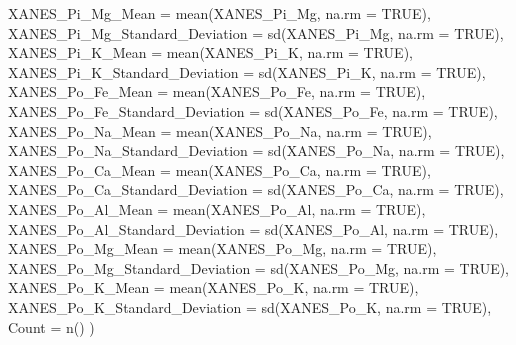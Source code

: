 \documentclass[
]{article}
\newenvironment{Shaded}{\begin{snugshade}}{\end{snugshade}}
\newcommand{\AttributeTok}[1]{\textcolor[rgb]{0.77,0.63,0.00}{#1}}
\newcommand{\ConstantTok}[1]{\textcolor[rgb]{0.00,0.00,0.00}{#1}}
\newcommand{\FunctionTok}[1]{\textcolor[rgb]{0.00,0.00,0.00}{#1}}
\newcommand{\NormalTok}[1]{#1}
\begin{document}
\begin{Shaded}
\begin{Highlighting}[]
    \AttributeTok{XANES\_Pi\_Mg\_Mean =} \FunctionTok{mean}\NormalTok{(XANES\_Pi\_Mg, }\AttributeTok{na.rm =} \ConstantTok{TRUE}\NormalTok{),}
    \AttributeTok{XANES\_Pi\_Mg\_Standard\_Deviation =} \FunctionTok{sd}\NormalTok{(XANES\_Pi\_Mg, }\AttributeTok{na.rm =} \ConstantTok{TRUE}\NormalTok{),}
    \AttributeTok{XANES\_Pi\_K\_Mean =} \FunctionTok{mean}\NormalTok{(XANES\_Pi\_K, }\AttributeTok{na.rm =} \ConstantTok{TRUE}\NormalTok{),}
    \AttributeTok{XANES\_Pi\_K\_Standard\_Deviation =} \FunctionTok{sd}\NormalTok{(XANES\_Pi\_K, }\AttributeTok{na.rm =} \ConstantTok{TRUE}\NormalTok{),}
    \AttributeTok{XANES\_Po\_Fe\_Mean =} \FunctionTok{mean}\NormalTok{(XANES\_Po\_Fe, }\AttributeTok{na.rm =} \ConstantTok{TRUE}\NormalTok{),}
    \AttributeTok{XANES\_Po\_Fe\_Standard\_Deviation =} \FunctionTok{sd}\NormalTok{(XANES\_Po\_Fe, }\AttributeTok{na.rm =} \ConstantTok{TRUE}\NormalTok{),}
    \AttributeTok{XANES\_Po\_Na\_Mean =} \FunctionTok{mean}\NormalTok{(XANES\_Po\_Na, }\AttributeTok{na.rm =} \ConstantTok{TRUE}\NormalTok{),}
    \AttributeTok{XANES\_Po\_Na\_Standard\_Deviation =} \FunctionTok{sd}\NormalTok{(XANES\_Po\_Na, }\AttributeTok{na.rm =} \ConstantTok{TRUE}\NormalTok{),}
    \AttributeTok{XANES\_Po\_Ca\_Mean =} \FunctionTok{mean}\NormalTok{(XANES\_Po\_Ca, }\AttributeTok{na.rm =} \ConstantTok{TRUE}\NormalTok{),}
    \AttributeTok{XANES\_Po\_Ca\_Standard\_Deviation =} \FunctionTok{sd}\NormalTok{(XANES\_Po\_Ca, }\AttributeTok{na.rm =} \ConstantTok{TRUE}\NormalTok{),}
    \AttributeTok{XANES\_Po\_Al\_Mean =} \FunctionTok{mean}\NormalTok{(XANES\_Po\_Al, }\AttributeTok{na.rm =} \ConstantTok{TRUE}\NormalTok{),}
    \AttributeTok{XANES\_Po\_Al\_Standard\_Deviation =} \FunctionTok{sd}\NormalTok{(XANES\_Po\_Al, }\AttributeTok{na.rm =} \ConstantTok{TRUE}\NormalTok{),}
    \AttributeTok{XANES\_Po\_Mg\_Mean =} \FunctionTok{mean}\NormalTok{(XANES\_Po\_Mg, }\AttributeTok{na.rm =} \ConstantTok{TRUE}\NormalTok{),}
    \AttributeTok{XANES\_Po\_Mg\_Standard\_Deviation =} \FunctionTok{sd}\NormalTok{(XANES\_Po\_Mg, }\AttributeTok{na.rm =} \ConstantTok{TRUE}\NormalTok{),}
    \AttributeTok{XANES\_Po\_K\_Mean =} \FunctionTok{mean}\NormalTok{(XANES\_Po\_K, }\AttributeTok{na.rm =} \ConstantTok{TRUE}\NormalTok{),}
    \AttributeTok{XANES\_Po\_K\_Standard\_Deviation =} \FunctionTok{sd}\NormalTok{(XANES\_Po\_K, }\AttributeTok{na.rm =} \ConstantTok{TRUE}\NormalTok{),}
    \AttributeTok{Count =} \FunctionTok{n}\NormalTok{()}
\NormalTok{  )}
\end{Highlighting}
\end{Shaded}
\end{document}
